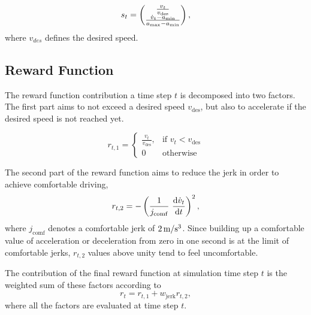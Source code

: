 \documentclass[review]{elsarticle}
\providecommand{\martinc}[1]{}                  %
\providecommand{\sub}[1]{_{\mathrm{#1}}}  %
\providecommand{\3}{{\ss}}
\begin{document}
	\begin{equation}
	\label{eq:stateFree}
	s_t = \begin{pmatrix} \frac{v_t}{v\sub{des}} \\ \frac{\dot{v}_t-a\sub{\rm min}}{a\sub{\rm max} - a\sub{\rm min}}\end{pmatrix},
	\end{equation}
	where $v_{des}$ defines the desired speed.
	\subsection{Reward Function}
	\label{rewardFunctionFree}
	The reward function contribution a time step $t$ is decomposed into two factors. The first part aims to
	not exceed a desired speed $v\sub{des}$, but also to accelerate if the
	desired speed is not reached yet.  
	\martinc{Man sollte auch den Fall $v>v\sub{des}$ ber\"ucksichtigen,
		der z.B. durch Einfahren in ein Streckensegment mit niedrigerem
		Tempolimit (Ortseinfahrt) realisiert wird, aber nicht so
		drastisch/unstetig wie hier, z.B. zweiten Fall durch
		$(v\sub{des}-v)/v\sub{des}$ statt =0 ersetzen}
	
	\begin{equation}
	\label{eq:r1Free}
	r_{t,1}  = 
	\begin{cases}
	\frac{v_t}{v\sub{des}},
	& \text{if } v_t < v\sub{des}\\
	0
	& \text{otherwise}
	\end{cases}
	\end{equation}
	
	The second part of the reward function aims to reduce the jerk in
	order to achieve comfortable driving, \martinc{No need for dotted
		quantities here; I propose using $j\sub{comf}$} \martinc{Really
		$\dv{a}{t}$ or the second state variable defined in~\eqref{eq:stateFree}?}
	\begin{equation}
	\label{eq:r2Free}
	r_{t,2} = -\left(\frac{1}{j\sub{comf}} \ \dv{\dot{v}_t}{t}\right)^2,
	\end{equation}
	where $j\sub{comf}$ denotes a comfortable jerk of $\unit[2]{m/s^3}$.
	Since building up a comfortable value of acceleration or deceleration
	from zero in one second is at the limit of comfortable jerks, $r_{t,2}$
	values above unity tend to feel uncomfortable.
	
	
	The contribution of the final reward function at simulation time step $t$ is the weighted
	sum of these factors according to
	\begin{equation}
	\label{rt1}
	r_{t} =r_{t,1} + w\sub{jerk} r_{t,2},
	\end{equation}
	where all the factors are evaluated at time step $t$. 
	
\end{document}
